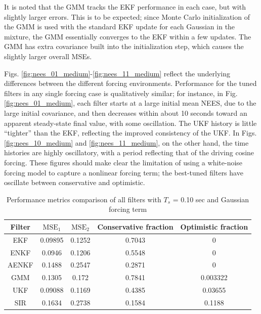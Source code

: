 \documentclass[]{article}
\begin{document}
It is noted that the GMM tracks the EKF performance in each case, but with slightly larger errors. This is to be expected; since Monte Carlo initialization of the GMM is used with the standard EKF update for each Gaussian in the mixture, the GMM essentially converges to the EKF within a few updates. The GMM has extra covariance built into the initialization step, which causes the slightly larger overall MSEs.

Figs. \ref{fig:nees_01_medium}-\ref{fig:nees_11_medium} reflect the underlying differences between the different forcing environments. Performance for the tuned filters in any single forcing case is qualitatively similar; for instance, in Fig. \ref{fig:nees_01_medium}, each filter starts at a large initial mean NEES, due to the large initial covariance, and then decreases within about 10 seconds toward an apparent steady-state final value, with some oscillation. The UKF history is little ``tighter'' than the EKF, reflecting the improved consistency of the UKF. In Figs. \ref{fig:nees_10_medium} and \ref{fig:nees_11_medium}, on the other hand, the time histories are highly oscillatory, with a period reflecting that of the driving cosine forcing. These figures should make clear the limitation of using a white-noise forcing model to capture a nonlinear forcing term; the best-tuned filters have oscillate between conservative and optimistic.

\begin{table}[h!]
\centering
\begin{tabular}{|c|c|c|c|c|}
\hline
Filter & $\mathrm{MSE}_1$ & $\mathrm{MSE}_2$ & Conservative fraction & Optimistic fraction \\
\hline
EKF &  0.09895 &   0.1252 &   0.7043 &        0 \\
\hline
ENKF &   0.0946 &   0.1206 &   0.5548 &        0 \\
\hline
AENKF &   0.1488 &   0.2547 &   0.2871 &        0 \\
\hline
GMM &   0.1305 &    0.172 &   0.7841 & 0.003322 \\
\hline
UKF &  0.09088 &   0.1169 &   0.4385 &  0.03655 \\
\hline
SIR &   0.1634 &   0.2738 &   0.1584 &   0.1188 \\
\hline
\end{tabular}
\caption{Performance metrics comparison of all filters with $T_s$ = 0.10 sec and Gaussian forcing term}
\label{table:compare_case_1_sample_0}
\end{table}
\end{document}
